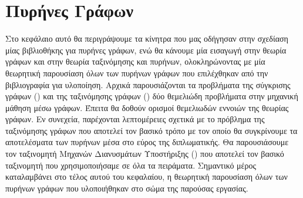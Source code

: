\chapter{Πυρήνες Γράφων}
\label{chap2}
Στο κεφάλαιο αυτό θα περιγράψουμε τα κίνητρα που μας οδήγησαν στην σχεδίαση μίας βιβλιοθήκης για πυρήνες γράφων, ενώ θα κάνουμε μία εισαγωγή στην θεωρία γράφων και στην θεωρία ταξινόμησης και πυρήνων, ολοκληρώνοντας με μία θεωρητική παρουσίαση όλων των πυρήνων γράφων που επιλέχθηκαν από την βιβλιογραφία για υλοποίηση.
Αρχικά παρουσιάζονται τα προβλήματα της σύγκρισης γράφων () και της ταξινόμησης γράφων () δύο θεμελιώδη προβλήματα στην μηχανική μάθηση μέσω γράφων.
Έπειτα θα δοθούν ορισμοί θεμελιωδών εννοιών της θεωρίας γράφων.
Εν συνεχεία, παρέχονται λεπτομέρειες σχετικά με το πρόβλημα της ταξινόμησης γράφων που αποτελεί τον βασικό τρόπο με τον οποίο θα συγκρίνουμε τα αποτελέσματα των πυρήνων μέσα στο εύρος της διπλωματικής.
Θα παρουσιάσουμε τον ταξινομητή Μηχανών Διανυσμάτων Υποστήριξης () που αποτελεί τον βασικό ταξινομητή που χρησιμοποιήσαμε σε όλα τα πειράματα.
Σημαντικό μέρος καταλαμβάνει στο τέλος αυτού του κεφαλαίου, η θεωρητική παρουσίαση όλων των πυρήνων γράφων που υλοποιήθηκαν στο σώμα της παρούσας εργασίας.
